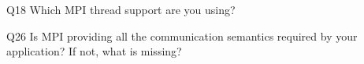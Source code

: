 \begin{description}%
\item{Q18} Which MPI thread support are you using?%
\item{Q26} Is MPI providing all the communication semantics required by your application? If not, what is missing?%
\end{description}%
